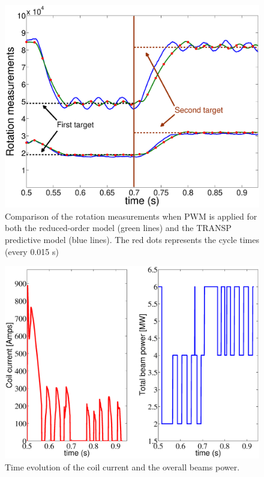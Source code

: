 \documentclass[12pt]{iopart}
\begin{document}
\begin{figure}
\centering
\includegraphics[width=\linewidth]{imene_figs/Goum14ln} 
\caption{Comparison of the rotation measurements when PWM is applied for both the reduced-order model (green lines) and the TRANSP predictive model (blue lines). The red dots represents the cycle times (every 0.015 s)}
\label{fig:rot14}
\end{figure}

\begin{figure}
\centering
\includegraphics[width=\linewidth]{imene_figs/Goum15ln}
\caption{Time evolution of the coil current and the overall beams power. }
\label{fig:rot15}
\end{figure}
\end{document}
